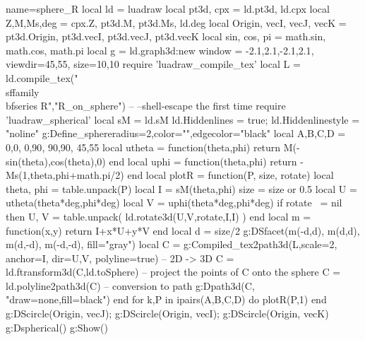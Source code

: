 \documentclass{standalone}
\begin{document}
\begin{luadraw}{name=sphere_R}
local ld = luadraw
local pt3d, cpx = ld.pt3d, ld.cpx
local Z,M,Ms,deg = cpx.Z, pt3d.M, pt3d.Ms, ld.deg
local Origin, vecI, vecJ, vecK = pt3d.Origin, pt3d.vecI, pt3d.vecJ, pt3d.vecK
local sin, cos, pi = math.sin, math.cos, math.pi
local g = ld.graph3d:new{ window = {-2.1,2.1,-2.1,2.1}, viewdir={45,55}, size={10,10} }
require 'luadraw_compile_tex'
local L = ld.compile_tex("\\sffamily\\bfseries R","R_on_sphere") -- --shell-escape the first time
require 'luadraw_spherical'
local sM = ld.sM
ld.Hiddenlines = true; ld.Hiddenlinestyle = "noline"
g:Define_sphere{radius=2,color="",edgecolor="black"}
local A,B,C,D = {0,0}, {0,90}, {90,90}, {45,55}
local utheta = function(theta,phi) return M(-sin(theta),cos(theta),0) end
local uphi = function(theta,phi) return -Ms(1,theta,phi+math.pi/2) end
local plotR = function(P, size, rotate)
    local theta, phi = table.unpack(P)
    local I = sM(theta,phi)
    size = size or 0.5
    local U = utheta(theta*deg,phi*deg)
    local V = uphi(theta*deg,phi*deg)
    if rotate ~= nil then
        U, V = table.unpack( ld.rotate3d({U,V},rotate,{I,I}) )
    end
    local m = function(x,y) return I+x*U+y*V end
    local d = size/2
    g:DSfacet({m(-d,d), m(d,d), m(d,-d), m(-d,-d)}, {fill="gray"})
    local C = g:Compiled_tex2path3d(L,{scale=2, anchor=I, dir={U,V}, polyline=true}) -- 2D -> 3D
    C = ld.ftransform3d(C,ld.toSphere) -- project the points of C onto the sphere
    C = ld.polyline2path3d(C) -- conversion to path
    g:Dpath3d(C, "draw=none,fill=black")
end
for k,P in ipairs({A,B,C,D}) do
    plotR(P,1)
end
g:DScircle({Origin, vecJ}); g:DScircle({Origin, vecI}); g:DScircle({Origin, vecK})
g:Dspherical()
g:Show()
\end{luadraw}
\end{document}
